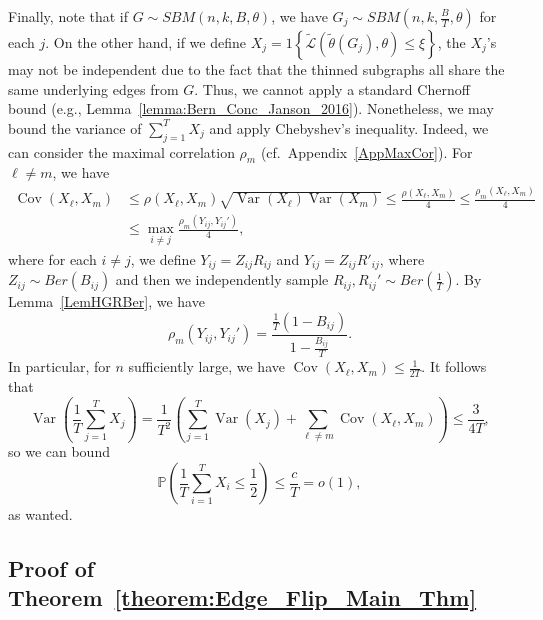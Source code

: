 \documentclass{article}
\newcommand{\mprob}{\mathbb{P}}
\newcommand{\Cov}{\ensuremath{\operatorname{Cov}}}
\newcommand{\Var}{\ensuremath{\operatorname{Var}}}
\begin{document}
Finally, note that if $G \sim SBM(n, k, B, \theta)$, we have $G_j \sim SBM(n, k, \frac{B}{T}, \theta)$ for each $j$. On the other hand, if we define $X_j = 1\left\{\widetilde{\mathcal{L}}(\widetilde{\theta}(G_j), \theta) \le \xi\right\}$, the $X_j$'s may not be independent due to the fact that the thinned subgraphs all share the same underlying edges from $G$. Thus, we cannot apply a standard Chernoff bound (e.g., Lemma~\ref{lemma:Bern_Conc_Janson_2016}). Nonetheless, we may bound the variance of $\sum_{j=1}^T X_j$ and apply Chebyshev's inequality. Indeed, we can consider the maximal correlation $\rho_m$ (cf.\ Appendix~\ref{AppMaxCor}). For $\ell \neq m$, we have
\begin{align*}
\Cov(X_\ell, X_m) & \le \rho(X_\ell, X_m) \sqrt{\Var(X_\ell) \Var(X_m)} \le \frac{\rho(X_\ell, X_m)}{4} \le \frac{\rho_m(X_\ell, X_m)}{4} \\
%
& \le \max_{i \neq j} \frac{\rho_m(Y_{ij}, Y_{ij}')}{4},
\end{align*}
where for each $i \neq j$, we define $Y_{ij} = Z_{ij} R_{ij}$ and $Y_{ij} = Z_{ij} R'_{ij}$, where $Z_{ij} \sim Ber(B_{ij})$ and then we independently sample $R_{ij}, R_{ij}' \sim Ber\left(\frac{1}{T}\right)$. By Lemma~\ref{LemHGRBer}, we have
\begin{equation*}
\rho_m(Y_{ij}, Y_{ij}') = \frac{\frac{1}{T}(1 - B_{ij})}{1-\frac{B_{ij}}{T}}.
\end{equation*}
In particular, for $n$ sufficiently large, we have $\Cov(X_\ell, X_m) \le \frac{1}{2T}$. It follows that
\begin{equation*}
\Var\left(\frac{1}{T}\sum_{j=1}^T X_j\right) = \frac{1}{T^2}\left(\sum_{j=1}^T \Var(X_j) + \sum_{\ell \neq m} \Cov(X_\ell, X_m)\right) \le \frac{3}{4T},
\end{equation*}
so we can bound
\begin{equation*}
\mprob\left(\frac{1}{T} \sum_{i=1}^T X_i \le \frac{1}{2}\right) \le \frac{c}{T} = o(1),
\end{equation*}
as wanted.


\subsection{Proof of Theorem~\ref{theorem:Edge_Flip_Main_Thm}}
\label{AppEFMain}
\end{document}
